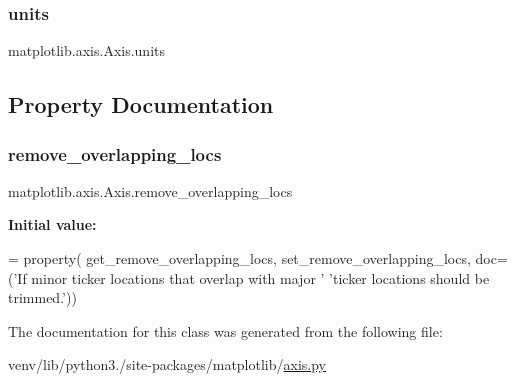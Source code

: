 \mbox{\label{classmatplotlib_1_1axis_1_1Axis_a8c868533f5e8f1f82485fb7635367013}} 
\subsubsection{\texorpdfstring{units}{units}}
{\footnotesize\ttfamily matplotlib.\+axis.\+Axis.\+units}



\subsection{Property Documentation}
\mbox{\label{classmatplotlib_1_1axis_1_1Axis_a68ee3542bbed21240da63d12cd29c1f7}} 
\subsubsection{\texorpdfstring{remove\+\_\+overlapping\+\_\+locs}{remove\_overlapping\_locs}}
{\footnotesize\ttfamily matplotlib.\+axis.\+Axis.\+remove\+\_\+overlapping\+\_\+locs\hspace{0.3cm}{\ttfamily [static]}}

{\bfseries Initial value\+:}
\begin{DoxyCode}
=  property(
        get\_remove\_overlapping\_locs, set\_remove\_overlapping\_locs,
        doc=(\textcolor{stringliteral}{'If minor ticker locations that overlap with major '}
             \textcolor{stringliteral}{'ticker locations should be trimmed.'}))
\end{DoxyCode}


The documentation for this class was generated from the following file\+:\begin{DoxyCompactItemize}
\item 
venv/lib/python3./site-\/packages/matplotlib/\hyperlink{axis_8py}{axis.\+py}\end{DoxyCompactItemize}
